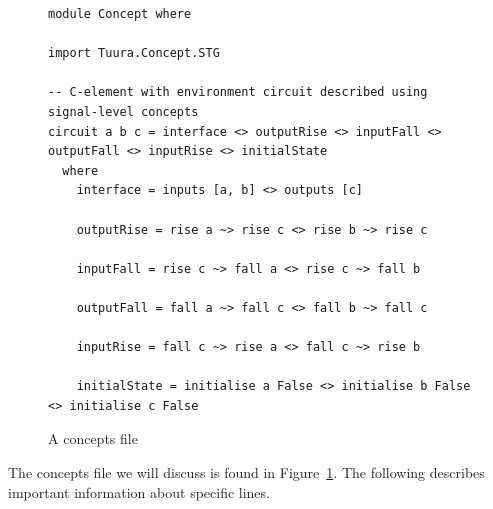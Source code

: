 \documentclass[british,technote,compsoc]{IEEEtran}
\begin{document}
\begin{figure}[H]
\begin{centering}

\begin{verbatim}
module Concept where

import Tuura.Concept.STG

-- C-element with environment circuit described using signal-level concepts
circuit a b c = interface <> outputRise <> inputFall <> outputFall <> inputRise <> initialState
  where
    interface = inputs [a, b] <> outputs [c]

    outputRise = rise a ~> rise c <> rise b ~> rise c

    inputFall = rise c ~> fall a <> rise c ~> fall b

    outputFall = fall a ~> fall c <> fall b ~> fall c

    inputRise = fall c ~> rise a <> fall c ~> rise b

    initialState = initialise a False <> initialise b False <> initialise c False
\end{verbatim}

\par\end{centering}

\begin{centering}
\protect\caption{\label{fig:concepts_file}A concepts file}

\par\end{centering}

\end{figure}

The concepts file we will discuss is found in Figure~\ref{fig:concepts_file}. The following describes important information about specific lines.
\end{document}
